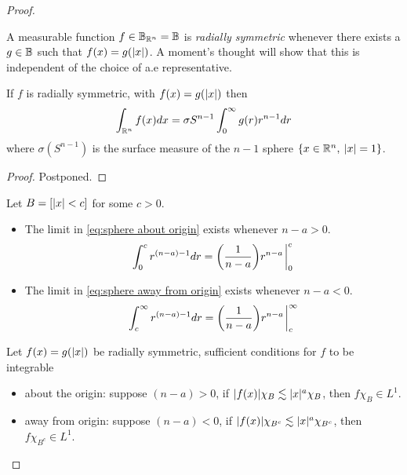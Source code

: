 \documentclass[../main-v2-manifolds.tex]{subfiles}
\begin{document}
\begin{proof}
\begin{note}[Integrability of $C$]\label{note:integrability of C sobolev embedding theorem}
A measurable function $f\in{\mathbb{B}}_{{\mathbb{R}^n}}={\mathbb{B}}$ is \emph{radially symmetric} whenever there exists a $g\in{\mathbb{B}}$ such that $f(x) = g(\vert {x} \vert)$. A moment's thought will show that this is independent of the choice of a.e representative. 
\begin{lemma}
    If $f$ is radially symmetric, with $f(x) = g(\vert {x} \vert)$ then
    \begin{equation}
        \int_{{\mathbb{R}^n}}f(x) dx = \sigma{S^{n-1}}\int_0^\infty g(r)r^{n-1}     dr
        \label{eq:polar integration folland 2.51}
    \end{equation}
    where $\sigma(S^{n-1})$ is the surface measure of the $n-1$ sphere $\{x\in{\mathbb{R}^n},\: \vert {x} \vert=1\}$.
\end{lemma}
\begin{proof}
    Postponed.
\end{proof}
Let $B = [\vert {x} \vert< c]$ for some $c>0$. 
\begin{itemize}
    \item The limit in \cref{eq:sphere about origin} exists whenever $n-a>0$.
    \begin{equation}
        \int_0^c r^{(n-a)-1}dr =\qty(\frac{1}{n-a})r^{n-a}\eval^{c}_0
        \label{eq:sphere about origin}
    \end{equation}
    \item The limit in \cref{eq:sphere away from origin} exists whenever $n-a<0$.
    \begin{equation}
        \int_c^\infty r^{(n-a)-1}dr = \qty(\frac{1}{n-a})r^{n-a}\eval^{\infty}_{c}
        \label{eq:sphere away from origin}
    \end{equation}
\end{itemize}
\begin{lemma}
    Let $f(x) = g(\vert {x} \vert)$ be radially symmetric, sufficient conditions for $f$ to be integrable
    \begin{itemize}
        \item about the origin: suppose $(n-a)>0$, if $\vert {f(x)} \vert\chi_B\lesssim \vert {x} \vert^{a}\chi_B$, then $f\chi_B\in L^1$.
        \item away from origin: suppose $(n-a)<0$, if $\vert {f(x)} \vert\chi_{B^c}\lesssim\vert {x} \vert^{a}\chi_{B^c}$, then $f\chi_{B^c}\in L^1$.
    \end{itemize}
\end{lemma}

\end{note}
\end{proof}
\end{document}
